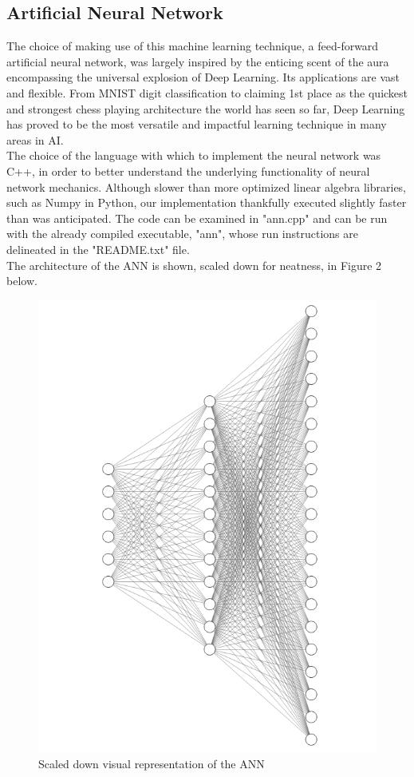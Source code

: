 \documentclass[a4paper]{article}
\begin{document}
\subsection{Artificial Neural Network}
The choice of making use of this machine learning technique, a feed-forward artificial neural network, was largely inspired by the enticing scent of the aura encompassing the universal explosion of Deep Learning. Its applications are vast and flexible. From MNIST digit classification to claiming 1st place as the quickest and strongest chess playing architecture the world has seen so far, Deep Learning has proved to be the most versatile and impactful learning technique in many areas in AI.
\\[12pt]
The choice of the language with which to implement the neural network was C++, in order to better understand the underlying functionality of neural network mechanics. Although slower than more optimized linear algebra libraries, such as Numpy in Python, our implementation thankfully executed slightly faster than was anticipated. The code can be examined in "ann.cpp" and can be run with the already compiled executable, "ann", whose run instructions are delineated in the "README.txt" file.
\\[12pt]
The architecture of the ANN is shown, scaled down for neatness, in Figure 2 below.
\\[12pt]
\begin{figure}[h]
\includegraphics[scale=0.2]{neuralnet.png}
\caption{Scaled down visual representation of the ANN}
\end{figure}
\end{document}
